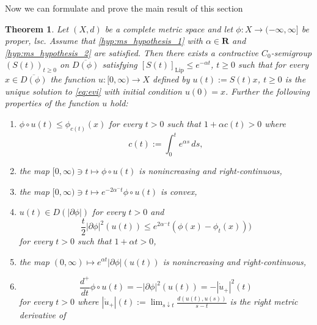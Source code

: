 \documentclass[a4paper,11pt, leqno]{scrreprt} %
\renewcommand{\leq}{\leqslant}
\renewcommand{\leq}{\leqslant}
\renewcommand{\geq}{\geqslant}
\newcommand{\R}{\mathbf R}
\theoremstyle{change}
\newcounter{acounter}[chapter]
\newtheorem{theorem}[acounter]{Theorem}
\theoremstyle{nonumberplain}
\begin{document}
Now we can formulate and prove the main result of this section
\begin{theorem}\label{th:ms_thm_2}
  Let $(X, d)$ be a complete metric space and let $\phi: X \to
  (-\infty, \infty]$ be proper, lsc. Assume that
  \ref{hyp:ms_hypothesis_1} with $\alpha \in \R$ and
  \ref{hyp:ms_hypothesis_2} are satisfied. Then there exists a contractive
  $C_0$-semigroup $(S(t))_{t \geq 0}$ on $\overline{D(\phi)}$
  satisfying $[S(t)]_{\text{Lip}} \leq e^{-\alpha t}$, $t \geq 0$ such
  that for every $x \in \overline{D(\phi)}$ the function $u:[0,
  \infty) \to X$ defined by $u(t) := S(t)x$, $t \geq 0$ is the unique
  solution to \eqref{eq:evi} with initial condition $u(0) =
  x$. Further the following properties of the function $u$ hold:
  \begin{enumerate}
  \item \label{item:ms_thm_2_1} $\phi \circ u(t) \leq \phi_{c(t)}(x)$
    for every $t > 0$ such that $1 + \alpha c(t) > 0$ where
    \begin{equation}
      \label{eq:ms_thm_2_1}
      c(t) := \int_0^t e^{\alpha s} \, ds,
    \end{equation}
    \item \label{item:ms_thm_2_2} the map $[0, \infty) \ni t \mapsto
      \phi \circ u(t)$ is nonincreasing and right-continuous,
    \item \label{item:ms_thm_2_3} the map $[0, \infty) \ni t \mapsto
      e^{-2 \alpha^- t} \phi \circ u(t)$ is convex,
    \item \label{item:ms_thm_2_4} $u(t) \in D(|\partial \phi|)$ for
      every $t > 0$ and
      \begin{equation}
        \label{eq:ms_thm_2_2}
        \frac{t}2 |\partial \phi|^2(u(t)) \leq e^{2 \alpha^-t}(\phi(x)
        - \phi_t(x)))
      \end{equation}
      for every $t > 0$ such that $1 + \alpha t > 0$,
    \item \label{item:ms_thm_2_5} the map $(0, \infty) \mapsto
      e^{\alpha t} |\partial \phi|(u(t))$ is nonincreasing and
      right-continuous,
    \item \label{item:ms_thm_2_6}
      \begin{equation}
        \label{eq:ms_thm_2_3}
        \frac{d^+}{dt} \phi \circ u(t) = -|\partial \phi|^2(u(t)) =
        -|\dot u_+|^2(t)
      \end{equation}
      for every $t > 0$ where $|\dot u_+|(t) := \lim_{s \downarrow t}
      \frac{d(u(t), u(s))}{s - t}$ is the right metric derivative of

\end{enumerate}
\end{theorem}
\end{document}
